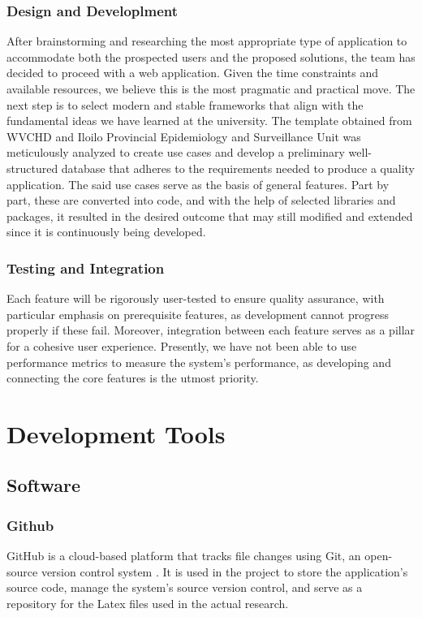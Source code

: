 \subsubsection{Design and Developlment}
After brainstorming and researching the most appropriate type of application to accommodate both the prospected users and the proposed solutions, the team has decided to proceed with a web application. Given the time constraints and available resources, we believe this is the most pragmatic and practical move. The next step is to select modern and stable frameworks that align with the fundamental ideas we have learned at the university. The template obtained from WVCHD and Iloilo Provincial Epidemiology and Surveillance Unit was meticulously analyzed to create use cases and develop a preliminary well-structured database that adheres to the requirements needed to produce a quality application. The said use cases serve as the basis of general features. Part by part, these are converted into code, and with the help of selected libraries and packages, it resulted in the desired outcome that may still modified and extended since it is continuously being developed. 

\subsubsection{Testing and Integration}
Each feature will be rigorously user-tested to ensure quality assurance, with particular emphasis on prerequisite features, as development cannot progress properly if these fail. Moreover, integration between each feature serves as a pillar for a cohesive user experience. Presently, we have not been able to use performance metrics to measure the system's performance, as developing and connecting the core features is the utmost priority. 

\section{Development Tools}
\subsection{Software}

\subsubsection{Github}
GitHub is a cloud-based platform that tracks file changes using Git, an open-source version control system \cite{github-no-date}. It is used in the project to store the application's source code, manage the system's source version control, and serve as a repository for the Latex files used in the actual research.


